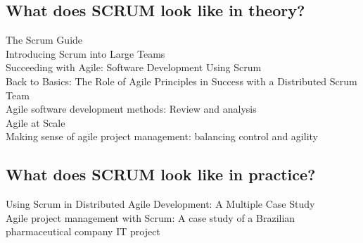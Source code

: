 \subsection*{What does SCRUM look like in theory?}

The Scrum Guide\citep{schwaber2011scrum}\\
Introducing Scrum into Large Teams\citep{maximini2018introducing}\\
Succeeding with Agile: Software Development Using Scrum\citep{cohn2010succeeding}\\
Back to Basics: The Role of Agile Principles in Success with a Distributed Scrum Team\citep{berczuk2007back}\\
Agile software development methods: Review and analysis\citep{abrahamsson2017agile}\\
Agile at Scale\citep{sutherland2018atScale}\\
Making sense of agile project management: balancing control and agility\citep{cobb2011making}\\

\subsection*{What does SCRUM look like in practice?}

Using Scrum in Distributed Agile Development: A Multiple Case Study\citep{paasivaara2009using}\\
Agile project management with Scrum: A case study of a Brazilian pharmaceutical company IT project\citep{azanha2017agile}\\